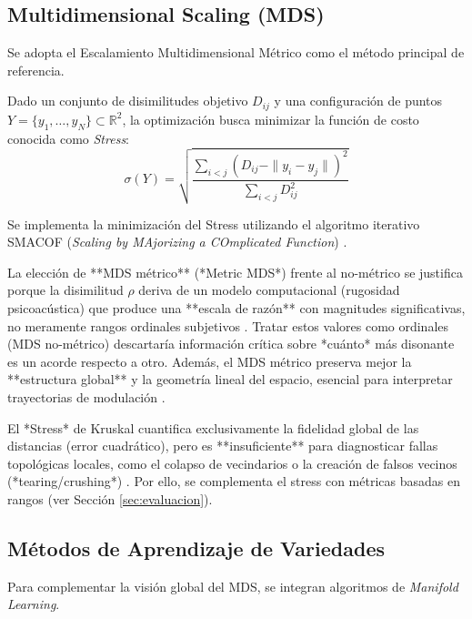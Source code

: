 \subsection{Multidimensional Scaling (MDS)}

Se adopta el Escalamiento Multidimensional Métrico como el método principal de referencia.

\begin{definition}
Dado un conjunto de disimilitudes objetivo $D_{ij}$ y una configuración de puntos $Y = \{y_1, \dots, y_N\} \subset \mathbb{R}^2$, la optimización busca minimizar la función de costo conocida como \emph{Stress}:
\begin{equation}
\sigma(Y) = \sqrt{\frac{\sum_{i<j} (D_{ij} - \|y_i - y_j\|)^2}{\sum_{i<j} D_{ij}^2}}
\end{equation}
\end{definition}

Se implementa la minimización del Stress utilizando el algoritmo iterativo SMACOF (\textit{Scaling by MAjorizing a COmplicated Function}) \cite{Borg2005}.

La elección de **MDS métrico** (*Metric MDS*) frente al no-métrico se justifica porque la disimilitud $\rho$ deriva de un modelo computacional (rugosidad psicoacústica) que produce una **escala de razón** con magnitudes significativas, no meramente rangos ordinales subjetivos \cite{setharesLocalConsonanceRelationship1993}. Tratar estos valores como ordinales (MDS no-métrico) descartaría información crítica sobre *cuánto* más disonante es un acorde respecto a otro. Además, el MDS métrico preserva mejor la **estructura global** y la geometría lineal del espacio, esencial para interpretar trayectorias de modulación \cite{Cox2001}.

El *Stress* de Kruskal cuantifica exclusivamente la fidelidad global de las distancias (error cuadrático), pero es **insuficiente** para diagnosticar fallas topológicas locales, como el colapso de vecindarios o la creación de falsos vecinos (*tearing/crushing*) \cite{Venna2006}. Por ello, se complementa el stress con métricas basadas en rangos (ver Sección \ref{sec:evaluacion}).

\subsection{Métodos de Aprendizaje de Variedades}

Para complementar la visión global del MDS, se integran algoritmos de \textit{Manifold Learning}.

